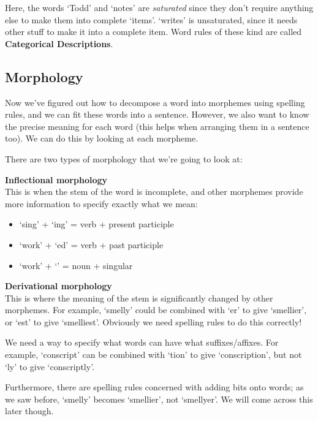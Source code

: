 Here, the words `Todd' and `notes' are \textit{saturated} since they don't
require anything else to make them into complete `items'. `writes' is
unsaturated, since it needs other stuff to make it into a complete item. Word
rules of these kind are called \textbf{Categorical Descriptions}.

\subsection{Morphology}

Now we've figured out how to decompose a word into morphemes using spelling
rules, and we can fit these words into a sentence. However, we also want to know the precise meaning for each word (this helps when arranging them in a sentence too). We can do this by looking at each morpheme.

There are two types of morphology that we're going to look at:

\begin{description}
  \item \textbf{Inflectional morphology}\\
    This is when the stem of the word is incomplete, and other morphemes 
    provide more information to specify exactly what we mean:

    \begin{itemize}
      \item `sing' + `ing' = verb + present participle
      \item `work' + `ed' = verb + past participle
      \item `work' + `' = noun + singular
    \end{itemize}

  \item \textbf{Derivational morphology}\\
    This is where the meaning of the stem is significantly changed by other 
    morphemes. For example, `smelly' could be combined with `er' to give 
    `smellier', or `est' to give `smelliest'. Obviously we need spelling rules 
    to do this correctly!
\end{description}

We need a way to specify what words can have what suffixes/affixes. For example,
`conscript' can be combined with `tion' to give `conscription', but not `ly' to
give `conscriptly'.

Furthermore, there are spelling rules concerned with adding bits onto words; as
we saw before, `smelly' becomes `smellier', not `smellyer'. We will come across
this later though.


